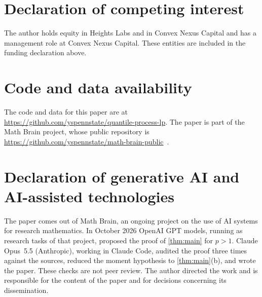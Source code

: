 \documentclass[11pt]{amsart}
\theoremstyle{remark}
\begin{document}
\section*{Declaration of competing interest}
The author holds equity in Heights Labs and in Convex Nexus Capital and has a management role at Convex Nexus Capital. These entities are included in the funding declaration above.

\section*{Code and data availability}
The code and data for this paper are at \url{https://github.com/yspennstate/quantile-process-lp}. The paper is part of the Math Brain project, whose public repository is \url{https://github.com/yspennstate/math-brain-public}~\cite{MathBrainRepo}.

\section*{Declaration of generative AI and AI-assisted technologies}
The paper comes out of Math Brain, an ongoing project on the use of AI systems for research mathematics. In October 2026 OpenAI GPT models, running as research tasks of that project, proposed the proof of \cref{thm:main} for $p>1$. Claude Opus~5.5 (Anthropic), working in Claude Code, audited the proof three times against the sources, reduced the moment hypothesis to \cref{thm:main}(b), and wrote the paper. These checks are not peer review. The author directed the work and is responsible for the content of the paper and for decisions concerning its dissemination.



\end{document}
